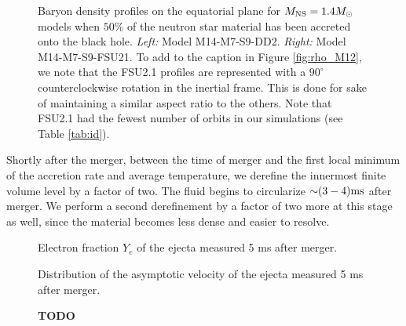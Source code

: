 \begin{figure}
\begin{subfigure}[b]{0.475\textwidth}
		\label{fig:rho_M14_FSU21}
		\centering
	\end{subfigure}
	\caption[Density profiles on equatorial plane for $1.4 M_{\odot}$ models]{
	Baryon density profiles on the equatorial plane for $M_{\rm NS} = 1.4 M_{\odot}$ models when $50\%$ of the neutron star material has been accreted onto the black hole.
	\textit{Left:} Model M14-M7-S9-DD2.
	\textit{Right:} Model M14-M7-S9-FSU21.
	To add to the caption in Figure \ref{fig:rho_M12}, we note that the FSU2.1 profiles are represented with a $90^{\circ}$ counterclockwise rotation in the inertial frame.  This is done for sake of maintaining a similar aspect ratio to the others.  Note that FSU2.1 had the fewest number of orbits in our simulations (see Table \ref{tab:id}). 
	}
	\label{fig:rho_M14}
\end{figure}

Shortly after the merger, between the time of merger and the first local minimum of the accretion rate and average temperature, we derefine the innermost finite volume level by a factor of two.  The fluid begins to circularize $\mathord{\sim} (3-4) {\rm ms}$ after merger.  We perform a second derefinement by a factor of two more at 
this stage as well, since the material becomes less dense and easier to resolve.

\begin{figure}
	\centering
	
	\caption[Composition of the ejecta]{
		Electron fraction $Y_e$ of the ejecta measured 5 ms after merger.
	}
	\label{fig:Yehisto}
\end{figure}

\begin{figure}
	\centering
	
	\caption[Distribution of the asymptotic velocity of the ejecta]{
	Distribution of the asymptotic velocity of the ejecta measured 5 ms after merger.
}
	\label{fig:vrhisto}
\end{figure}

%	

\begin{figure}
	\centering
	
	\caption[Angular distribution of the ejecta 5 ms after merger]{
		\textbf{TODO}
	}
	\label{fig:costhetahisto}
\end{figure}

\begin{figure}
	\centering
	
	\label{fig:phihisto}
\end{figure}




